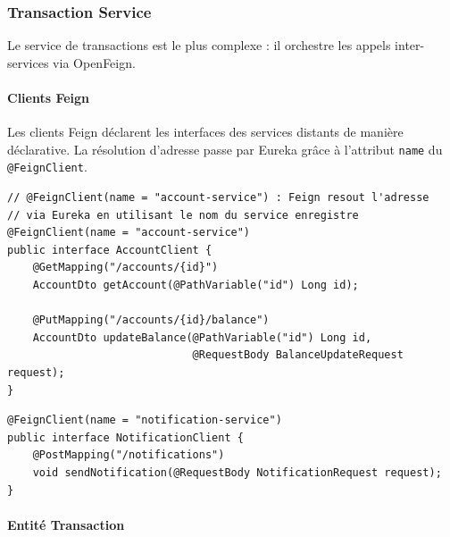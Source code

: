 \documentclass[12pt,a4paper]{article}
\begin{document}
\subsubsection{Transaction Service}

Le service de transactions est le plus complexe : il orchestre les appels inter-services via OpenFeign.

\paragraph{Clients Feign}

Les clients Feign déclarent les interfaces des services distants de manière déclarative. La résolution d'adresse passe par Eureka grâce à l'attribut \texttt{name} du \texttt{@FeignClient}.

\begin{lstlisting}[style=javastyle, caption={AccountClient.java --- Client Feign pour le account-service}, label=lst:feignacc]
// @FeignClient(name = "account-service") : Feign resout l'adresse
// via Eureka en utilisant le nom du service enregistre
@FeignClient(name = "account-service")
public interface AccountClient {
    @GetMapping("/accounts/{id}")
    AccountDto getAccount(@PathVariable("id") Long id);

    @PutMapping("/accounts/{id}/balance")
    AccountDto updateBalance(@PathVariable("id") Long id,
                             @RequestBody BalanceUpdateRequest request);
}
\end{lstlisting}

\begin{lstlisting}[style=javastyle, caption={NotificationClient.java --- Client Feign pour le notification-service}, label=lst:feignnotif]
@FeignClient(name = "notification-service")
public interface NotificationClient {
    @PostMapping("/notifications")
    void sendNotification(@RequestBody NotificationRequest request);
}
\end{lstlisting}

\paragraph{Entité Transaction}
\end{document}
